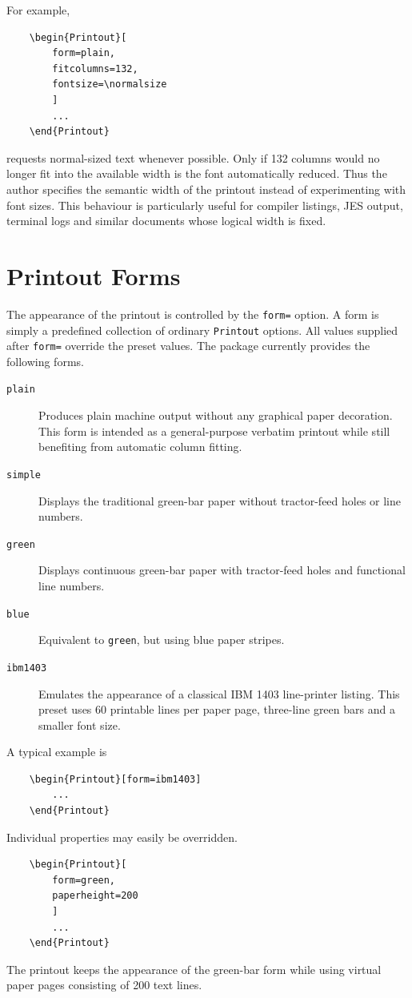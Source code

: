 \documentclass[
11pt,
a4paper,
oneside
]{scrbook}
\begin{document}
{\noindent For example,
\begin{verbatim}
	\begin{Printout}[
		form=plain,
		fitcolumns=132,
		fontsize=\normalsize
		]
		...
	\end{Printout}
\end{verbatim}
requests normal-sized text whenever possible.
Only if 132 columns would no longer fit into the available width is the
font automatically reduced.
Thus the author specifies the semantic width of the printout instead of
experimenting with font sizes.
This behaviour is particularly useful for compiler listings, JES output,
terminal logs and similar documents whose logical width is fixed.

\section{Printout Forms}

The appearance of the printout is controlled by the
\texttt{form=} option.
A form is simply a predefined collection of ordinary
\texttt{Printout} options.
All values supplied after \texttt{form=} override the preset values.
The package currently provides the following forms.
\begin{description}
	\item[\texttt{plain}]
	Produces plain machine output without any graphical paper decoration.
	This form is intended as a general-purpose verbatim printout while still
	benefiting from automatic column fitting.
	
	\item[\texttt{simple}]
	Displays the traditional green-bar paper without tractor-feed holes or
	line numbers.

	\item[\texttt{green}]
	Displays continuous green-bar paper with tractor-feed holes and
	functional line numbers.
	
	\item[\texttt{blue}]
	Equivalent to \texttt{green}, but using blue paper stripes.
	
	\item[\texttt{ibm1403}]
	Emulates the appearance of a classical IBM 1403 line-printer listing.
	This preset uses 60 printable lines per paper page, three-line green
	bars and a smaller font size.
\end{description}
A typical example is
\begin{verbatim}
	\begin{Printout}[form=ibm1403]
		...
	\end{Printout}
\end{verbatim}
Individual properties may easily be overridden.
\begin{verbatim}
	\begin{Printout}[
		form=green,
		paperheight=200
		]
		...
	\end{Printout}
\end{verbatim}
The printout keeps the appearance of the green-bar form while using
virtual paper pages consisting of 200 text lines.

}
\end{document}
